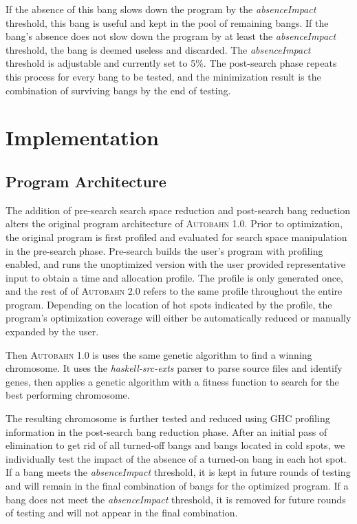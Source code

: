 \documentclass[format=sigplan, review=true]{acmart}
\newcommand{\hotspot}[0]{hot spot}
\newcommand{\hotspots}[0]{hot spots}
\newcommand{\coldspots}[0]{cold spots}
\newcommand{\useless}[0]{useless}
\newcommand{\Ao}[0]{\textsc{Autobahn 1.0}}
\newcommand{\At}[0]{\textsc{Autobahn 2.0}}
\newcommand{\preopt}[0]{pre-search}
\newcommand{\postopt}[0]{post-search}
\newcommand{\Preopt}[0]{Pre-search}
\newcommand{\absim}[0]{\textit{absenceImpact}}
\begin{document}
If the absence of this bang slows down the program by the \absim{} threshold, this bang is useful and kept in the pool of remaining bangs. If the bang's absence does not slow down the program by at least the \absim{} threshold, the bang is deemed \useless{} and discarded. The \absim{} threshold is adjustable and currently set to 5\%. The \postopt{} phase repeats this process for every bang to be tested, and the minimization result is the combination of surviving bangs by the end of testing.

\section{Implementation}

\subsection{Program Architecture}

The addition of \preopt{} search space reduction and \postopt{} bang reduction alters the original program architecture of \Ao{}. Prior to optimization, the original program is first profiled and evaluated for search space manipulation in the \preopt{} phase. \Preopt{} builds the user's program with profiling enabled, and runs the unoptimized version with the user provided representative input to obtain a time and allocation profile. The profile is only generated once, and the rest of of \At{} refers to the same profile throughout the entire program. Depending on the location of \hotspots{} indicated by the profile, the program's optimization coverage will either be automatically reduced or manually expanded by the user. 

Then \Ao{} is uses the same genetic algorithm to find a winning chromosome. It uses the \textit{haskell-src-exts} parser to parse source files and identify genes, then applies a genetic algorithm with a fitness function to search for the best performing chromosome.

The resulting chromosome is further tested and reduced using GHC profiling information in the \postopt{} bang reduction phase. After an initial pass of elimination to get rid of all turned-off bangs and bangs located in \coldspots{}, we individually test the impact of the absence of a turned-on bang in each \hotspot{}. If a bang meets the \absim{} threshold, it is kept in future rounds of testing and will remain in the final combination of bangs for the optimized program. If a bang does not meet the \absim{} threshold, it is removed for future rounds of testing and will not appear in the final combination. 
\end{document}
